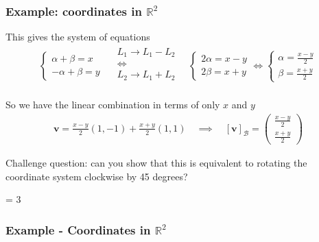 \documentclass[usenames,dvipsnames,aspectratio=169,10pt]{beamer}
\def \EXAMPLEVERSION {3} %
\numberwithin{equation}{section}
\begin{document}
\begin{frame}
\frametitle{Example: coordinates in $\mathbb{R}^2$}

This gives the system of equations
\begin{align*}
\begin{cases}
\alpha + \beta = x \\
-\alpha + \beta = y 
\end{cases}
%
\quad
%
\begin{matrix}
L_1 \to L_1 - L_2 \\
\iff  \\
L_2 \to L_1 + L_2 \\
\end{matrix}
%
\quad
%
\begin{cases}
2\alpha= x-y \\
2\beta = x+y 
\end{cases}
%
\iff
%
\begin{cases}
\alpha= \frac{x-y}{2} \\
\beta = \frac{x+y}{2} 
\end{cases}
\end{align*}

So we have the linear combination in terms of only $x$ and $y$
\begin{align*}
\mathbf{v} = \frac{x-y}{2} (1,-1) + \frac{x+y}{2} (1,1) 
%
\quad \implies \quad 
%
[\mathbf{v}]_\mathcal{B}
=
\begin{pmatrix}
\frac{x-y}{2}  \\
\frac{x+y}{2}
\end{pmatrix}
\end{align*}

Challenge question: can you show that this is equivalent to rotating the coordinate system clockwise by 45 degrees?

\end{frame}
\fi 


\ifnum \EXAMPLEVERSION = 3
\begin{frame}
\frametitle{Example - Coordinates in $\mathbb{R}^2$}
\end{frame}

\begin{frame}
\end{frame}
\fi 
\end{document}

